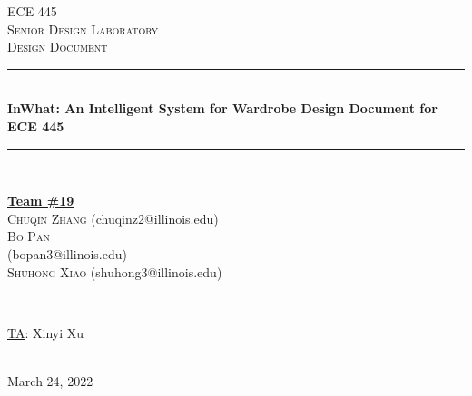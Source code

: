 \documentclass[12pt]{article}
\begin{document}
\begin{titlepage}
\newcommand{\HRule}{\rule{\linewidth}{0.1mm}} 
\center %
 
\textsc{\Large ECE 445}\\[0.5cm] %
\textsc{\large Senior Design Laboratory}\\[0.5cm] %
\textsc{\Large Design Document }\\[0.5cm] %

\HRule \\[0.5cm]
\huge \textbf{	InWhat: An Intelligent System for Wardrobe Design Document for ECE 445} %
\HRule \\[2cm]
 
\begin{minipage}{0.5\textwidth}
    \begin{center} \large
        \underline{\textbf{Team \#19}} \\ \medskip
        \textsc{Chuqin Zhang} (chuqinz2@illinois.edu) \\
        \textsc{Bo Pan}\\ (bopan3@illinois.edu) \\  %
        \textsc{Shuhong Xiao} (shuhong3@illinois.edu) \\

    \end{center}
\end{minipage} \\[1.5cm]

\begin{minipage}{0.5\textwidth}
    \begin{center}
        \large
        \underline{TA}: Xinyi Xu
    \end{center}
\end{minipage} \\[1cm]

{\large March 24, 2022} %

\vfill %

\end{titlepage}
\tableofcontents
\newpage
\end{document}
